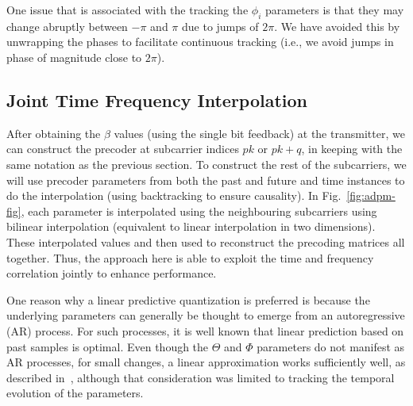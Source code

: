 \documentclass[journal,10pt,twocolumn]{IEEEtran}
\begin{document}
One issue that is associated with the tracking the $\phi_i$ parameters
is that they may change abruptly between $-\pi$ and
$\pi$ due to jumps of $2\pi$. We have avoided this by unwrapping the
phases to facilitate continuous tracking (i.e., we avoid jumps in
phase of magnitude close to $2\pi$).
\subsection{Joint Time Frequency Interpolation}
\label{interp}
After obtaining the $\beta$ values (using the single bit feedback) at
the transmitter, we can construct the precoder at subcarrier indices
$pk$ or $pk+q$, in keeping with the same notation as the previous
section. To construct the rest of the subcarriers, we will use
precoder parameters from both the past and future and time instances
to do the interpolation (using backtracking to ensure causality). In
Fig.~\ref{fig:adpm-fig}, each parameter is interpolated using the
neighbouring subcarriers using bilinear interpolation (equivalent to
linear interpolation in two dimensions). These interpolated values and
then used to reconstruct the precoding matrices all together. Thus,
the approach here is able to exploit the time and frequency
correlation jointly to enhance performance.

One reason why a linear predictive quantization is preferred is
because the underlying parameters can generally be thought to emerge
from an autoregressive (AR) process. For such processes, it is well
known that linear prediction based on past samples is optimal. Even
though the $\Theta$ and $\Phi$ parameters do not manifest as AR
processes, for small changes, a linear approximation works
sufficiently well, as described in~\cite{4114278}, although that
consideration was limited to tracking the temporal evolution of the
parameters.
\end{document}
